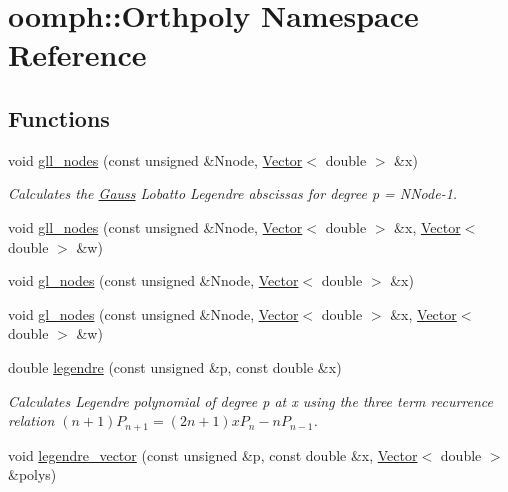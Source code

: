 \hypertarget{namespaceoomph_1_1Orthpoly}{}\section{oomph\+:\+:Orthpoly Namespace Reference}
\label{namespaceoomph_1_1Orthpoly}
\subsection*{Functions}
\begin{DoxyCompactItemize}
\item 
void \hyperlink{namespaceoomph_1_1Orthpoly_ab6f86bfb7e2a8832560862c47fc60db5}{gll\+\_\+nodes} (const unsigned \&Nnode, \hyperlink{classoomph_1_1Vector}{Vector}$<$ double $>$ \&x)
\begin{DoxyCompactList}\small\item\em Calculates the \hyperlink{classoomph_1_1Gauss}{Gauss} Lobatto Legendre abscissas for degree p = N\+Node-\/1. \end{DoxyCompactList}\item 
void \hyperlink{namespaceoomph_1_1Orthpoly_a49a1cd8050963fdbf455f520e8a8b228}{gll\+\_\+nodes} (const unsigned \&Nnode, \hyperlink{classoomph_1_1Vector}{Vector}$<$ double $>$ \&x, \hyperlink{classoomph_1_1Vector}{Vector}$<$ double $>$ \&w)
\item 
void \hyperlink{namespaceoomph_1_1Orthpoly_a97c90eff7749f215b78cf88324d77e13}{gl\+\_\+nodes} (const unsigned \&Nnode, \hyperlink{classoomph_1_1Vector}{Vector}$<$ double $>$ \&x)
\item 
void \hyperlink{namespaceoomph_1_1Orthpoly_a9b11a3992826d8daf747565d4cfcc819}{gl\+\_\+nodes} (const unsigned \&Nnode, \hyperlink{classoomph_1_1Vector}{Vector}$<$ double $>$ \&x, \hyperlink{classoomph_1_1Vector}{Vector}$<$ double $>$ \&w)
\item 
double \hyperlink{namespaceoomph_1_1Orthpoly_aa71411bff7bff140b78e33bebc5133c0}{legendre} (const unsigned \&p, const double \&x)
\begin{DoxyCompactList}\small\item\em Calculates Legendre polynomial of degree p at x using the three term recurrence relation $ (n+1) P_{n+1} = (2n+1)xP_{n} - nP_{n-1} $. \end{DoxyCompactList}\item 
void \hyperlink{namespaceoomph_1_1Orthpoly_ab6f2929f6ec8fde591799edaebc66380}{legendre\+\_\+vector} (const unsigned \&p, const double \&x, \hyperlink{classoomph_1_1Vector}{Vector}$<$ double $>$ \&polys)

\end{DoxyCompactItemize}
